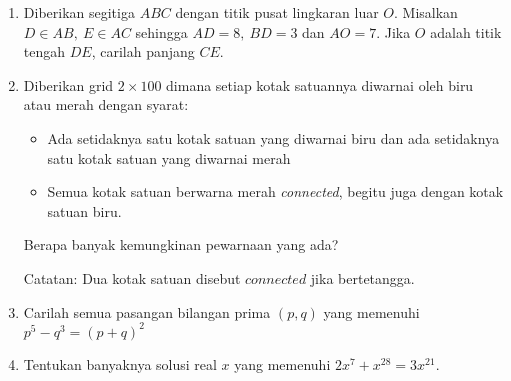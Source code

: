 \documentclass{article}
\begin{document}
\begin{enumerate}[resume]
		\item Diberikan segitiga $ABC$ dengan titik pusat lingkaran luar $O$. Misalkan $D\in{AB},\ E\in{AC}$ sehingga $AD=8,\ BD=3$ dan $AO=7$. Jika $O$ adalah titik tengah $DE$, carilah panjang $CE$. 
		
		\item Diberikan grid $2 \times 100$ dimana setiap kotak satuannya diwarnai oleh biru atau merah dengan syarat: 
		\begin{itemize}
			\item Ada setidaknya satu kotak satuan yang diwarnai biru dan ada setidaknya satu kotak satuan yang diwarnai merah
			\item Semua kotak satuan berwarna merah \textit{connected}, begitu juga dengan kotak satuan biru.
		\end{itemize}
		Berapa banyak kemungkinan pewarnaan yang ada?
		
		Catatan: Dua kotak satuan disebut $\textit{connected}$ jika bertetangga.
		
		\item Carilah semua pasangan bilangan prima $(p,q)$ yang memenuhi $p^5-q^3=(p+q)^2$
		
		\item Tentukan banyaknya solusi real $x$ yang memenuhi $2x^7+x^{28}=3x^{21}.$
\end{enumerate}
\end{document}
